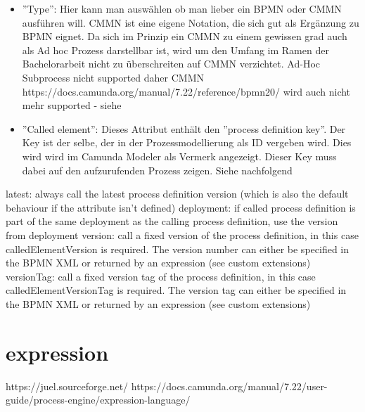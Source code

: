 \begin{itemize}
    \item ''Type'': Hier kann man auswählen ob man lieber ein \acs{BPMN} oder \acs{CMMN} ausführen will. \acs{CMMN} ist eine eigene Notation, die sich gut als Ergänzung zu \acs{BPMN} eignet. Da sich im Prinzip ein CMMN zu einem gewissen grad auch als Ad hoc Prozess darstellbar ist, wird um den Umfang im Ramen der Bachelorarbeit nicht zu überschreiten auf \acs{CMMN} verzichtet. Ad-Hoc Subprocess nicht supported daher CMMN
    https://docs.camunda.org/manual/7.22/reference/bpmn20/
    wird auch nicht mehr supported - siehe
    \item ''Called element'': Dieses Attribut enthält den ''process definition key''. Der Key ist der selbe, der in der Prozessmodellierung als ID vergeben wird. Dies wird wird im 
    Camunda Modeler als Vermerk angezeigt. Dieser Key muss dabei auf den aufzurufenden Prozess zeigen. Siehe nachfolgend
\end{itemize}
\clearpage
{}


    latest: always call the latest process definition version (which is also the default behaviour if the attribute isn’t defined)
    deployment: if called process definition is part of the same deployment as the calling process definition, use the version from deployment
    version: call a fixed version of the process definition, in this case calledElementVersion is required. The version number can either be specified in the BPMN XML or returned by an expression (see custom extensions)
    versionTag: call a fixed version tag of the process definition, in this case calledElementVersionTag is required. The version tag can either be specified in the BPMN XML or returned by an expression (see custom extensions)


\section{expression}
https://juel.sourceforge.net/
https://docs.camunda.org/manual/7.22/user-guide/process-engine/expression-language/

